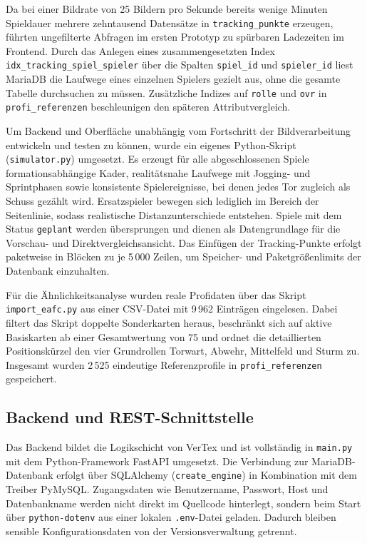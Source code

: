 Da bei einer Bildrate von 25 Bildern pro Sekunde bereits wenige Minuten
Spieldauer mehrere zehntausend Datensätze in \texttt{tracking\_punkte} erzeugen,
führten ungefilterte Abfragen im ersten Prototyp zu spürbaren Ladezeiten im
Frontend. Durch das Anlegen eines zusammengesetzten Index
\texttt{idx\_tracking\_spiel\_spieler} über die Spalten \texttt{spiel\_id} und
\texttt{spieler\_id} liest MariaDB die Laufwege eines einzelnen Spielers gezielt
aus, ohne die gesamte Tabelle durchsuchen zu müssen. Zusätzliche Indizes auf
\texttt{rolle} und \texttt{ovr} in \texttt{profi\_referenzen} beschleunigen den
späteren Attributvergleich.

Um Backend und Oberfläche unabhängig vom Fortschritt der Bildverarbeitung
entwickeln und testen zu können, wurde ein eigenes Python-Skript
(\texttt{simulator.py}) umgesetzt. Es erzeugt für alle abgeschlossenen Spiele
formationsabhängige Kader, realitätsnahe Laufwege mit Jogging- und
Sprintphasen sowie konsistente Spielereignisse, bei denen jedes Tor zugleich
als Schuss gezählt wird. Ersatzspieler bewegen sich lediglich im Bereich der
Seitenlinie, sodass realistische Distanzunterschiede entstehen. Spiele mit dem
Status \texttt{geplant} werden übersprungen und dienen als Datengrundlage für
die Vorschau- und Direktvergleichsansicht. Das Einfügen der Tracking-Punkte
erfolgt paketweise in Blöcken zu je 5\,000 Zeilen, um Speicher- und
Paketgrößenlimits der Datenbank einzuhalten.

Für die Ähnlichkeitsanalyse wurden reale Profidaten über das Skript
\texttt{import\_eafc.py} aus einer CSV-Datei mit 9\,962 Einträgen eingelesen.
Dabei filtert das Skript doppelte Sonderkarten heraus, beschränkt sich auf
aktive Basiskarten ab einer Gesamtwertung von 75 und ordnet die detaillierten
Positionskürzel den vier Grundrollen Torwart, Abwehr, Mittelfeld und Sturm zu.
Insgesamt wurden 2\,525 eindeutige Referenzprofile in \texttt{profi\_referenzen}
gespeichert.

\subsection{Backend und REST-Schnittstelle}
\label{sec:backend}

Das Backend bildet die Logikschicht von VerTex und ist vollständig in
\texttt{main.py} mit dem Python-Framework FastAPI umgesetzt. Die Verbindung zur
MariaDB-Datenbank erfolgt über SQLAlchemy (\texttt{create\_engine}) in
Kombination mit dem Treiber PyMySQL. Zugangsdaten wie Benutzername, Passwort,
Host und Datenbankname werden nicht direkt im Quellcode hinterlegt, sondern
beim Start über \texttt{python-dotenv} aus einer lokalen \texttt{.env}-Datei
geladen. Dadurch bleiben sensible Konfigurationsdaten von der
Versionsverwaltung getrennt.

